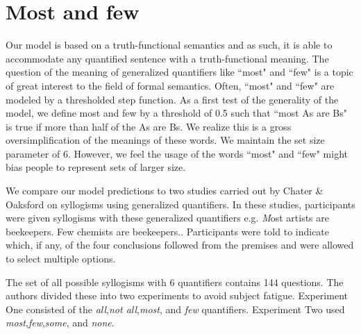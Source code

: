 \documentclass[10pt,letterpaper]{article}
\begin{document}
\section{Most and few}

Our model is based on a truth-functional semantics and as such, it is able to accommodate any quantified sentence with a truth-functional meaning. The question of the meaning of generalized quantifiers like ``most" and ``few" is a topic of great interest to the field of formal semantics. Often, ``most" and ``few" are modeled by a thresholded step function. As a first test of the generality of the model, we define most and few by a threshold of 0.5 such that ``most As are Bs" is true if more than half of the As are Bs. We realize this is a gross oversimplification of the meanings of these words. We maintain the set size parameter of 6. However, we feel the usage of the words ``most" and ``few" might bias people to represent sets of larger size.

We compare our model predictions to two studies carried out by Chater \& Oaksford on syllogisms using generalized quantifiers. In these studies, participants were given syllogisms with these generalized quantifiers e.g. {\emph Most artists are beekeepers. Few chemists are beekeepers.}. Participants were told to indicate which, if any, of the four conclusions followed from the premises and were allowed to select multiple options.

The set of all possible syllogisms with 6 quantifiers contains 144 questions.  The authors divided these into two experiments to avoid subject fatigue. Experiment One consisted of the \emph{all},\emph{not all},\emph{most}, and \emph{few} quantifiers. Experiment Two used \emph{most},\emph{few},\emph{some}, and \emph{none}. 
\end{document}
